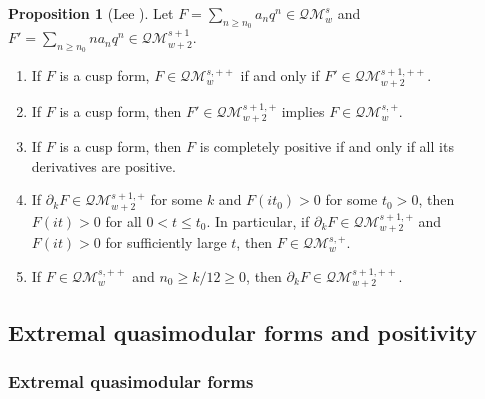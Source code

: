 \documentclass[10pt,reqno]{amsproc}
\newcommand{\QM}{\mathcal{QM}}
\newcommand{\1}{\mathds{1}}	%
\theoremstyle{definition}
\newtheorem{proposition}[theorem]{Proposition}
\theoremstyle{remark}
\begin{document}
\begin{proposition}[Lee \cite{lee2024algebraic}]
\label{prop:derpos}
Let $F = \sum_{n \geq n_0} a_n q^n \in \QM_{w}^{s}$ and $F' = \sum_{n \geq n_0} na_n q^n \in \QM_{w+2}^{s + 1}$.
\begin{enumerate}
    \item If $F$ is a cusp form, $F \in \QM_{w}^{s, ++}$ if and only if $F' \in \QM_{w+2}^{s + 1, ++}$.
    \item If $F$ is a cusp form, then $F' \in \QM_{w +2}^{s +1, +}$ implies $F \in \QM_{w}^{s, +}$.
    \item If $F$ is a cusp form, then $F$ is completely positive if and only if all its derivatives are positive.
    \item If $\partial_k F \in \QM_{w+2}^{s+1, +}$ for some $k$ and $F(it_0) > 0$ for some $t_0 > 0$, then $F(it) > 0$ for all $0 < t \le t_0$.
    In particular, if $\partial_k F \in \QM_{w+2}^{s+1,+}$ and $F(it) > 0$ for sufficiently large $t$, then $F \in \QM_{w}^{s, +}$.
    \item If $F \in \QM_{w}^{s,++}$ and $n_0 \geq k / 12 \geq 0$, then $\partial_k F \in \QM_{w+2}^{s+1, ++}$.
\end{enumerate}
\end{proposition}


\subsection{Extremal quasimodular forms and positivity}

\subsubsection{Extremal quasimodular forms}
\end{document}
